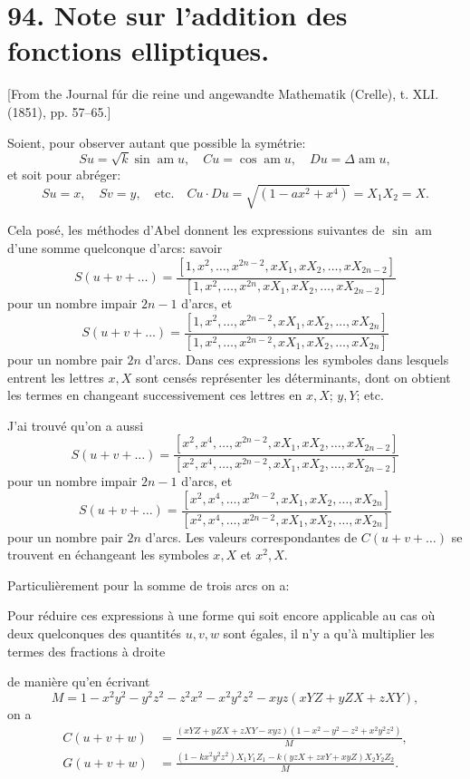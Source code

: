\documentclass[12pt,a4paper]{article}
\theoremstyle{definition}
\begin{document}
\newpage

\section*{94. Note sur l'addition des fonctions elliptiques.}

[From the Journal f\'{u}r die reine und angewandte Mathematik (Crelle), t. XLI. (1851), pp. 57--65.]

Soient, pour observer autant que possible la sym\'{e}trie:
\[
Su = \sqrt{k} \sin \operatorname{am} u, \quad Cu = \cos \operatorname{am} u, \quad Du = \Delta \operatorname{am} u,
\]
et soit pour abr\'{e}ger:
\[
Su = x, \quad Sv = y, \quad \text{etc.} \quad Cu \cdot Du = \sqrt{(1 - ax^2 + x^4)} = X_1 X_2 = X.
\]

Cela pos\'{e}, les m\'{e}thodes d'Abel donnent les expressions suivantes de $\sin \operatorname{am}$ d'une somme quelconque d'arcs: savoir
\[
S(u + v + \ldots) = \frac{[1, x^2, \ldots, x^{2n-2}, xX_1, xX_2, \ldots, xX_{2n-2}]}{[1, x^2, \ldots, x^{2n}, xX_1, xX_2, \ldots, xX_{2n-2}]}
\]
pour un nombre impair $2n-1$ d'arcs, et
\[
S(u + v + \ldots) = \frac{[1, x^2, \ldots, x^{2n-2}, xX_1, xX_2, \ldots, xX_{2n}]}{[1, x^2, \ldots, x^{2n-2}, xX_1, xX_2, \ldots, xX_{2n}]}
\]
pour un nombre pair $2n$ d'arcs. Dans ces expressions les symboles dans lesquels entrent les lettres $x, X$ sont cens\'{e}s repr\'{e}senter les d\'{e}terminants, dont on obtient les termes en changeant successivement ces lettres en $x, X$; $y, Y$; etc.

J'ai trouv\'{e} qu'on a aussi
\[
S(u + v + \ldots) = \frac{[x^2, x^4, \ldots, x^{2n-2}, xX_1, xX_2, \ldots, xX_{2n-2}]}{[x^2, x^4, \ldots, x^{2n-2}, xX_1, xX_2, \ldots, xX_{2n-2}]}
\]
pour un nombre impair $2n-1$ d'arcs, et
\[
S(u + v + \ldots) = \frac{[x^2, x^4, \ldots, x^{2n-2}, xX_1, xX_2, \ldots, xX_{2n}]}{[x^2, x^4, \ldots, x^{2n-2}, xX_1, xX_2, \ldots, xX_{2n}]}
\]
pour un nombre pair $2n$ d'arcs. Les valeurs correspondantes de $C(u + v + \ldots)$ se trouvent en \'{e}changeant les symboles $x, X$ et $x^2, X$.

Particuli\`{e}rement pour la somme de trois arcs on a:

Pour r\'{e}duire ces expressions \`{a} une forme qui soit encore applicable au cas o\`{u} deux quelconques des quantit\'{e}s $u, v, w$ sont \'{e}gales, il n'y a qu'\`{a} multiplier les termes des fractions \`{a} droite


de mani\`{e}re qu'en \'{e}crivant
\[
M = 1 - x^2y^2 - y^2z^2 - z^2x^2 - x^2y^2z^2 - xyz(xYZ + yZX + zXY),
\]
on a
\begin{align*}
C(u + v + w) &= \frac{(xYZ + yZX + zXY - xyz)(1 - x^2 - y^2 - z^2 + x^2y^2z^2)}{M}, \\
G(u + v + w) &= \frac{(1 - kx^2y^2z^2)X_1Y_1Z_1 - k(yzX + zxY + xyZ)X_2Y_2Z_2}{M}.
\end{align*}
\end{document}
